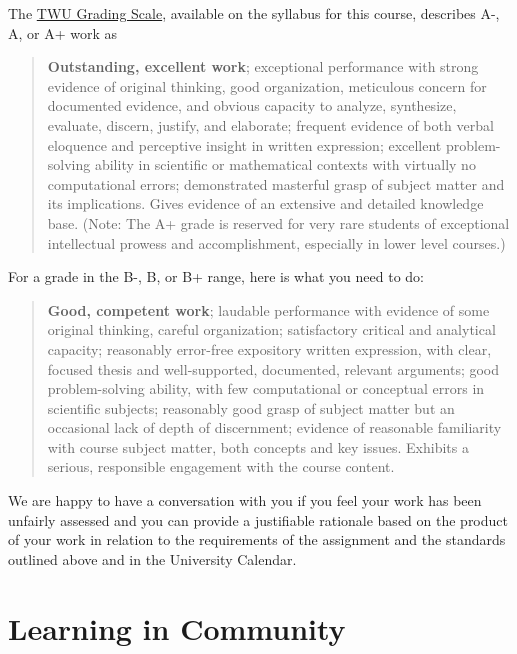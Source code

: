 \documentclass[
]{book}
\begin{document}
The \href{https://www.twu.ca/about/policies-guidelines/university-standard-grading-system}{TWU Grading Scale}, available on the syllabus for this course, describes A-, A, or A+ work as

\begin{quote}
\textbf{Outstanding, excellent work}; exceptional performance with strong evidence of original thinking, good organization, meticulous concern for documented evidence, and obvious capacity to analyze, synthesize, evaluate, discern, justify, and elaborate; frequent evidence of both verbal eloquence and perceptive insight in written expression; excellent problem-solving ability in scientific or mathematical contexts with virtually no computational errors; demonstrated masterful grasp of subject matter and its implications. Gives evidence of an extensive and detailed knowledge base. (Note: The A+ grade is reserved for very rare students of exceptional intellectual prowess and accomplishment, especially in lower level courses.)
\end{quote}

For a grade in the B-, B, or B+ range, here is what you need to do:

\begin{quote}
\textbf{Good, competent work}; laudable performance with evidence of some original thinking, careful organization; satisfactory critical and analytical capacity; reasonably error-free expository written expression, with clear, focused thesis and well-supported, documented, relevant arguments; good problem-solving ability, with few computational or conceptual errors in scientific subjects; reasonably good grasp of subject matter but an occasional lack of depth of discernment; evidence of reasonable familiarity with course subject matter, both concepts and key issues. Exhibits a serious, responsible engagement with the course content.
\end{quote}

We are happy to have a conversation with you if you feel your work has been unfairly assessed and you can provide a justifiable rationale based on the product of your work in relation to the requirements of the assignment and the standards outlined above and in the University Calendar.

\hypertarget{learning-in-community}{%
\chapter{Learning in Community}\label{learning-in-community}}
\end{document}
